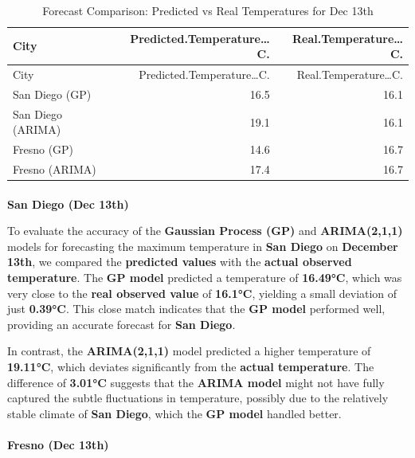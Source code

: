 \documentclass[
  11pt,
]{article}
\makeatletter
\let\oldparagraph\paragraph
\renewcommand{\paragraph}{
    \@ifstar
      \xxxParagraphStar
      \xxxParagraphNoStar
  }
\newcommand{\xxxParagraphStar}[1]{\oldparagraph*{#1}\mbox{}}
\newcommand{\xxxParagraphNoStar}[1]{\oldparagraph{#1}\mbox{}}
\makeatother
\begin{document}
\begin{longtable}[]{@{}lrr@{}}
\caption{Forecast Comparison: Predicted vs Real Temperatures for Dec
13th}\tabularnewline
\toprule\noalign{}
City & Predicted.Temperature\ldots C. & Real.Temperature\ldots C. \\
\midrule\noalign{}
\endfirsthead
\toprule\noalign{}
City & Predicted.Temperature\ldots C. & Real.Temperature\ldots C. \\
\midrule\noalign{}
\endhead
\bottomrule\noalign{}
\endlastfoot
San Diego (GP) & 16.5 & 16.1 \\
San Diego (ARIMA) & 19.1 & 16.1 \\
Fresno (GP) & 14.6 & 16.7 \\
Fresno (ARIMA) & 17.4 & 16.7 \\
\end{longtable}

\paragraph{\texorpdfstring{\textbf{San Diego (Dec
13th)}}{San Diego (Dec 13th)}}\label{san-diego-dec-13th}

To evaluate the accuracy of the \textbf{Gaussian Process (GP)} and
\textbf{ARIMA(2,1,1)} models for forecasting the maximum temperature in
\textbf{San Diego} on \textbf{December 13th}, we compared the
\textbf{predicted values} with the \textbf{actual observed temperature}.
The \textbf{GP model} predicted a temperature of \textbf{16.49°C}, which
was very close to the \textbf{real observed value} of \textbf{16.1°C},
yielding a small deviation of just \textbf{0.39°C}. This close match
indicates that the \textbf{GP model} performed well, providing an
accurate forecast for \textbf{San Diego}.

In contrast, the \textbf{ARIMA(2,1,1)} model predicted a higher
temperature of \textbf{19.11°C}, which deviates significantly from the
\textbf{actual temperature}. The difference of \textbf{3.01°C} suggests
that the \textbf{ARIMA model} might not have fully captured the subtle
fluctuations in temperature, possibly due to the relatively stable
climate of \textbf{San Diego}, which the \textbf{GP model} handled
better.

\paragraph{\texorpdfstring{\textbf{Fresno (Dec
13th)}}{Fresno (Dec 13th)}}\label{fresno-dec-13th}
\end{document}
